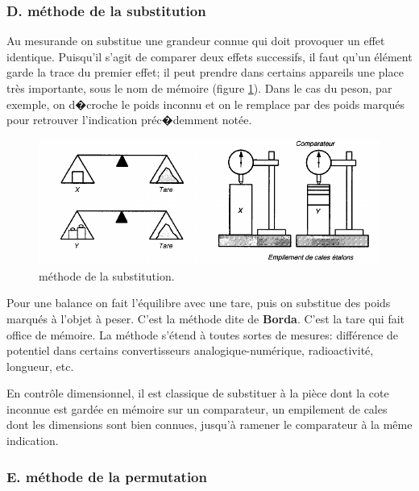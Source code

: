 \subsubsection{D. méthode de la substitution}

Au mesurande on substitue une grandeur connue qui doit provoquer un effet identique. Puisqu'il s'agit de comparer deux effets successifs, il faut qu'un élément garde la trace du premier effet; il peut prendre dans certains appareils une place très importante, sous le nom de mémoire (figure \ref{fig:metsub}). Dans le cas du peson, par exemple, on d�croche le poids inconnu et on le remplace par des poids marqués pour retrouver l'indication préc�demment notée.
\begin{figure}[h]
   \centering
   \includegraphics[width=15cm]{assets/figures/metsub.pdf}
   \caption{méthode de la substitution.}
   \label{fig:metsub}
\end{figure}

Pour une balance on fait l'équilibre avec une tare, puis on substitue des poids marqués à l'objet à peser. C'est la méthode dite de \textbf{Borda}. C'est la tare qui fait office de mémoire. La méthode s'étend à toutes sortes de mesures: différence de potentiel dans certains convertisseurs analogique-numérique, radioactivité, longueur, etc.

En contrôle dimensionnel, il est classique de substituer à la pièce dont la cote inconnue est gardée en mémoire sur un comparateur, un empilement de cales dont les dimensions sont bien connues, jusqu'à ramener le comparateur à la même indication.

\subsubsection{E. méthode de la permutation}

